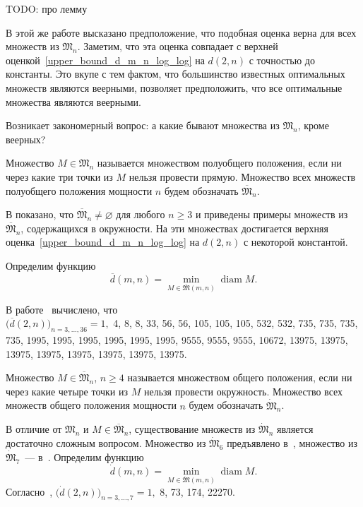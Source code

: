 TODO: про лемму

В этой же работе высказано предположение, что подобная оценка верна для всех множеств из $\mathfrak{M}_n$.
Заметим, что эта оценка совпадает с верхней оценкой~\eqref{upper_bound_d_m_n_log_log} на $d(2,n)$
с точностью до константы.
Это вкупе с тем фактом, что большинство известных оптимальных множеств являются веерными,
позволяет предположить, что все оптимальные множества являются веерными.

Возникает закономерный вопрос: а какие бывают множества из $\mathfrak{M}_n$,
кроме веерных?

\begin{definition}
	\cite{kurz2008minimum} Множество $M\in\mathfrak{M}_n$ называется множеством полуобщего положения,
	если ни через какие три точки из $M$ нельзя провести прямую.
	Множество всех множеств полуобщего положения мощности $n$ будем обозначать $\overline{\mathfrak{M}}_n$.
\end{definition}

В \cite{harborth1993upper} показано, что $\overline{\mathfrak{M}}_n\neq\varnothing$ для любого $n \geq 3$
и приведены примеры множеств из $\overline{\mathfrak{M}}_n$, содержащихся в окружности.
На эти множествах достигается верхняя оценка~\eqref{upper_bound_d_m_n_log_log} на $d(2,n)$
с некоторой константой.

Определим функцию~\cite{kurz2008minimum}
\begin{equation*}
	\overline{d}(m,n) = \min_{M\in\overline{\mathfrak{M}}(m,n)} \operatorname{diam} M
	.
\end{equation*}

В работе~\cite{kurz2008minimum} вычислено, что
\\
$\bigl(\overline{d}(2, n)\bigr)_{n=3,...,36} = 1,$
4, 8, 8, 33, 56, 56, 105, 105, 105, 532, 532, 735, 735, 735, 735,
1995, 1995, 1995, 1995, 1995, 1995, 9555, 9555, 9555, 10672,
13975, 13975, 13975, 13975, 13975, 13975, 13975, 13975.

\begin{definition}
	\cite{kurz2008minimum} Множество $M\in\overline{\mathfrak{M}}_n$, $n\geq 4$ называется множеством общего положения,
	если ни через какие четыре точки из $M$ нельзя провести окружность.
	Множество всех множеств общего положения мощности $n$ будем обозначать $\dot{\mathfrak{M}}_n$.
\end{definition}

В отличие от $\mathfrak{M}_n$ и $M\in\overline{\mathfrak{M}}_n$,
существование множеств из $\dot{\mathfrak{M}}_n$ является достаточно сложным вопросом.
Множество из $\dot{\mathfrak{M}}_6$ предъявлено в~\cite{noll1989nclusters},
множество из $\dot{\mathfrak{M}}_7$~--- в~\cite{kurz2008minimum}.
Определим функцию~\cite{kurz2008minimum}
\begin{equation*}
	\dot{d}(m,n) = \min_{M\in\dot{\mathfrak{M}}(m,n)} \operatorname{diam} M
	.
\end{equation*}
Согласно~\cite{kurz2008minimum},
$\bigl(\dot{d}(2,n)\bigr)_{n=3,...,7}
= 1,$ 8, 73, 174, 22270.

